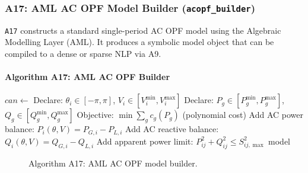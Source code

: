 \subsubsection{A17: AML AC OPF Model Builder (\texttt{acopf\_builder})}
\label{algo:a17}

\texttt{A17} constructs a standard single-period AC OPF model using the
Algebraic Modelling Layer (AML).  It produces a symbolic model object that
can be compiled to a dense or sparse NLP via A9.

\paragraph{Algorithm A17: AML AC OPF Builder}
\begin{algorithmic}[1]
  \State $\mathit{can} \gets$ 
  \State Declare: $\theta_i \in [-\pi,\pi]$, $V_i \in [V_i^{\min},V_i^{\max}]$
  \State Declare: $P_g \in [P_g^{\min},P_g^{\max}]$,
    $Q_g \in [Q_g^{\min},Q_g^{\max}]$
  \State Objective: $\min \sum_g c_g(P_g)$ (polynomial cost)
    \State Add AC power balance: $P_i(\theta,V) = P_{G,i} - P_{L,i}$
    \State Add AC reactive balance: $Q_i(\theta,V) = Q_{G,i} - Q_{L,i}$
  \EndFor
    \State Add apparent power limit:
      $P_{ij}^2 + Q_{ij}^2 \le S_{ij,\max}^2$
  \EndFor
  \State \Return model
\EndProcedure
\end{algorithmic}

\begin{figure}[H]
\centering
{}
\caption{Algorithm A17: AML AC OPF model builder.}
\label{fig:a17-flow}
\end{figure}

